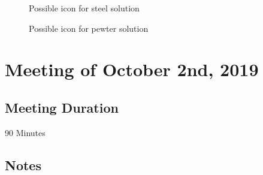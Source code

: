 \documentclass{article}
\begin{document}
  \begin{figure}[!htb]
  \caption {Possible icon for steel solution}
  \end{figure}

  \begin{figure}[!htb]
  \caption {Possible icon for pewter solution}
  \end{figure}








\section{Meeting of October 2nd, 2019}

\subsection{Meeting Duration}
90 Minutes

\subsection{Notes}
\end{document}
